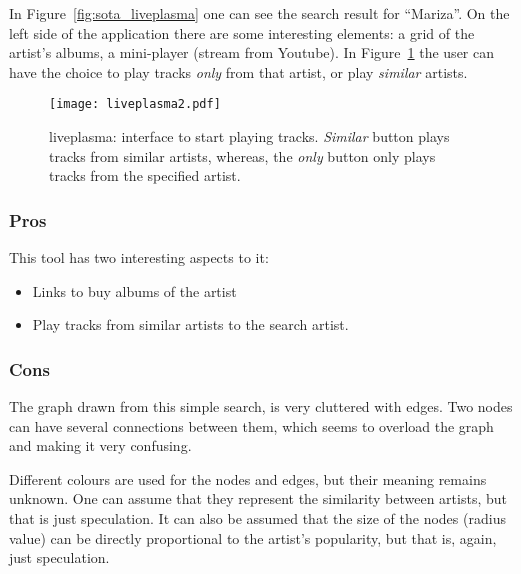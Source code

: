     In Figure~\ref{fig:sota_liveplasma} one can see the search result for ``Mariza''.
    On the left side of the application there are some interesting elements: a grid of the artist's albums, a mini-player (stream from Youtube).
    In Figure~\ref{fig:sota_liveplasma2} the user can have the choice to play tracks \emph{only} from that artist, or play \emph{similar} artists.

    \begin{figure}[b]
      \begin{center}
        \texttt{[image: liveplasma2.pdf]}
      \end{center}
      \caption{liveplasma: interface to start playing tracks. \emph{Similar} button plays tracks from similar artists, whereas, the \emph{only} button only plays tracks from the specified artist.}
      \label{fig:sota_liveplasma2}
    \end{figure}

    \subsubsection{Pros} %
    \label{ssub:liveplasma_pros}

      This tool has two interesting aspects to it:

      \begin{itemize}
        \item Links to buy albums of the artist
        \item Play tracks from similar artists to the search artist.
      \end{itemize}


    \subsubsection{Cons} %
    \label{ssub:liveplasma_cons}

      The graph drawn from this simple search, is very cluttered with edges.
      Two nodes can have several connections between them, which seems to overload the graph and making it very confusing.

      Different colours are used for the nodes and edges, but their meaning remains unknown. One can assume that they represent the similarity between artists, but that is just speculation.
      It can also be assumed that the size of the nodes (radius value) can be directly proportional to the artist's popularity, but that is, again, just speculation.

